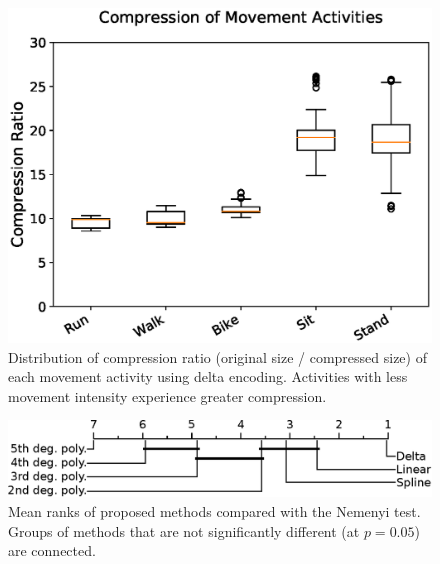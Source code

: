 \documentclass[journal]{IEEEtran}
\begin{document}
\begin{figure}

  \includegraphics[width=\linewidth]{movement.eps}
  \caption{Distribution of compression ratio (original size / compressed size) of each movement activity using delta encoding. Activities with less movement intensity experience greater compression.}
  \label{fig:movements}
  
\end{figure}

\begin{figure}
  \includegraphics[width=\linewidth]{nemenyi.eps}
  \caption{Mean ranks of proposed methods compared with the Nemenyi test. Groups of methods that are not significantly different (at $p = 0.05$) are connected.}
  \label{fig:general_compressor}
\end{figure}

%
%  

\end{document}
